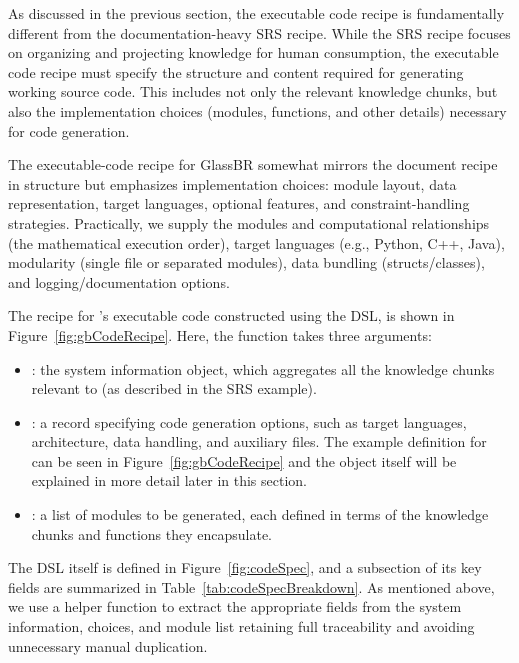 As discussed in the previous section, the executable code recipe is 
fundamentally different from the documentation-heavy SRS recipe. While the SRS 
recipe focuses on organizing and projecting knowledge for human consumption, 
the executable code recipe must specify the structure and content required for 
generating working source code. This includes not only the relevant knowledge 
chunks, but also the implementation choices (modules, functions, and other 
details) necessary for code generation. 

The executable-code recipe for GlassBR somewhat mirrors the document recipe in 
structure but emphasizes implementation choices: module layout, data 
representation, target languages, optional features, and constraint-handling 
strategies. Practically, we supply the modules and computational relationships 
(the mathematical execution order), target languages (e.g., Python, C++, Java),
modularity (single file or separated modules), data bundling (structs/classes), 
and logging/documentation options. 

The recipe for \gb{}'s executable code constructed using the 
 DSL, is shown in Figure~\ref{fig:gbCodeRecipe}. 
Here, the  function takes three arguments:
\begin{itemize}
\item {}: the system information object, which aggregates all the 
knowledge chunks relevant to \gb{} (as described in the SRS example).
\item {}: a record specifying code generation options, such as 
target languages, architecture, data handling, and auxiliary files. The example 
 definition for \gb{} can be seen in 
Figure~\ref{fig:gbCodeRecipe} and the object itself will be explained in more 
detail later in this section.
\item {}: a list of modules to be generated, each defined in terms 
of the knowledge chunks and functions they encapsulate.
\end{itemize}



The  DSL itself is defined in Figure~\ref{fig:codeSpec}, and 
a subsection of its key fields are summarized in 
Table~\ref{tab:codeSpecBreakdown}. As mentioned above, we use a helper function 
 to extract the appropriate fields from the system information, 
choices, and module list retaining full traceability and avoiding unnecessary 
manual duplication.

